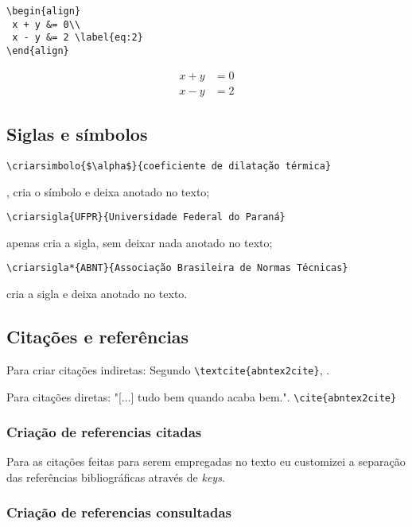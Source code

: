 \begin{lstlisting}
\begin{align}
 x + y &= 0\\
 x - y &= 2 \label{eq:2}
\end{align}
\end{lstlisting}


\begin{align}
x + y &= 0\\
x - y &= 2 \label{eq:2}
\end{align}

\subsection[Acronimos]{Siglas e símbolos}


\verb+\criarsimbolo{$\alpha$}{coeficiente de dilatação térmica}+ 

, cria o símbolo e deixa anotado no texto;

\verb+\criarsigla{UFPR}{Universidade Federal do Paraná}+ 

\label{item:UFPR} apenas cria a sigla, sem deixar nada anotado no texto;

\verb+\criarsigla*{ABNT}{Associação Brasileira de Normas Técnicas}+ 

 cria a sigla e deixa anotado no texto.

\subsection[Citações]{Citações e referências}

Para criar citações indiretas: Segundo \verb+\textcite{abntex2cite}+, \textcite{abntex2cite}.


Para citações diretas: "[...] tudo bem quando acaba bem."\cite{abntex2cite}. \verb+\cite{abntex2cite}+


\subsubsection{Criação de referencias citadas}

Para as citações feitas para serem empregadas no texto eu customizei a separação das referências bibliográficas através de \textit{keys}.


\subsubsection{Criação de referencias consultadas}

